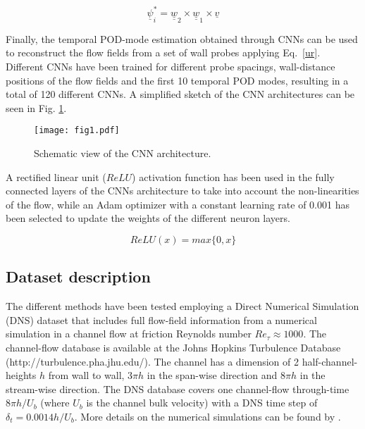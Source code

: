 \begin{equation}
   \underline{\psi}_i^*=\underline{\underline{w}}_2\times \underline{\underline{w}}_1 \times \underline{v}
\end{equation}{}

Finally, the temporal POD-mode estimation obtained through CNNs can be used to reconstruct the flow fields from a set of wall probes applying Eq.~\ref{ur}.
Different CNNs have been trained for different probe spacings, wall-distance positions of the flow fields and the first 10 temporal POD modes, resulting in a total of 120 different CNNs.
A simplified sketch of the CNN architectures can be seen in Fig. \ref{fig:schem}.

\begin{figure}
\texttt{[image: fig1.pdf]}%
\caption{\label{fig:schem}Schematic view of the CNN architecture.}
\end{figure}

A rectified linear unit ($ReLU$) activation function \citep{nair2010rectified} has been used in the fully connected layers of the CNNs architecture to take into account the non-linearities of the flow, while an Adam optimizer \citep{kingma2014adam} with a constant learning rate of 0.001 has been selected to update the weights of the different neuron layers.

\begin{equation}
ReLU(x)=max\{0,x\}
\end{equation}{}

\subsection{\label{sec:23}Dataset description}

The different methods have been tested employing a Direct Numerical Simulation (DNS) dataset that includes full flow-field information from a numerical simulation in a channel flow at friction Reynolds number $Re_{\tau}\approx 1000$.
The channel-flow database is available at the Johns Hopkins Turbulence Database (http://turbulence.pha.jhu.edu/).
The channel has a dimension of 2 half-channel-heights $h$ from wall to wall, $3\pi h$ in the span-wise direction and $8\pi h$ in the stream-wise direction.
The DNS database covers one channel-flow through-time $8\pi h/U_b$ (where $U_b$ is the channel bulk velocity) with a DNS time step of $\delta_t = 0.0014h/U_b$.
More details on the numerical simulations can be found by \citet{li2008public,yu2012studying}.

